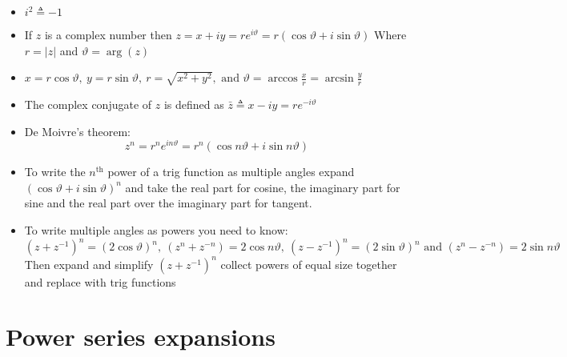 \documentclass{article}
\begin{document}
\begin{itemize}
\item \(i^2\triangleq-1\)
\item If \(z\) is a complex number then \(z=x+iy=re^{i\vartheta}=r(\cos\vartheta+i\sin\vartheta)\) Where \(r=|z|\) and \(\vartheta=\arg(z)\)
\item \(x=r\cos\vartheta,~y=r\sin\vartheta,~r=\sqrt{x^2+y^2}, \text{ and } \vartheta=\arccos\frac{x}{r}=\arcsin\frac{y}{r}\)
\item The complex conjugate of \(z\) is defined as \(\bar{z}\triangleq x-iy=re^{-i\vartheta}\)
\item De Moivre's theorem:
\[z^n=r^ne^{in\vartheta}=r^n(\cos n\vartheta+i\sin n\vartheta)\]
\item To write the \(n^{\text{th}}\) power of a trig function as multiple angles expand \((\cos\vartheta+i\sin\vartheta)^n\) and take the real part for cosine, the imaginary part for sine and the real part over the imaginary part for tangent.
\item To write multiple angles as powers you need to know:
\[\left(z+z^{-1}\right)^n=(2\cos\vartheta)^n,~\left(z^n+z^{-n}\right)=2\cos n\vartheta,~\left(z-z^{-1}\right)^n=(2\sin\vartheta)^n\text{ and }\left(z^n-z^{-n}\right)=2\sin n\vartheta\]
Then expand and simplify \((z+z^{-1})^n\) collect powers of equal size together and replace with trig functions
\end{itemize}

\section*{Power series expansions}
\end{document}
